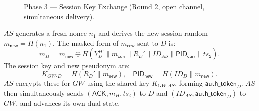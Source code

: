 \documentclass[conference]{IEEEtran}
\begin{document}
\begin{figure}[!t]
  \caption{Phase 3 — Session Key Exchange (Round 2, open channel, simultaneous delivery).}
  \label{fig:keyex}
\end{figure}

$AS$ generates a fresh nonce $n_1$ and derives the new session random
$m_\mathsf{new} = H(n_1)$.  The masked form of $m_\mathsf{new}$ sent to $D$
is:
\begin{equation}
  m_H = m_\mathsf{new} \oplus H(Y_D^{H'} \| m_\mathsf{curr} \| R_D'
        \| ID_{AS} \| \mathsf{PID}_\mathsf{curr} \| ts_2).
\end{equation}
The session key and new pseudonym are:
\begin{equation}
  K_{GW\text{-}D} = H(R_D' \| m_\mathsf{new}), \quad
  \mathsf{PID}_\mathsf{new} = H(ID_D \| m_\mathsf{new}).
\end{equation}
$AS$ encrypts these for $GW$ using the shared key
$K_{GW\text{-}AS}$, forming $\mathsf{auth\_token}_D$.
$AS$ then simultaneously sends $(\mathsf{ACK}, m_H, ts_2)$ to $D$ and
$(ID_{AS}, \mathsf{auth\_token}_D)$ to $GW$, and advances its own dual state.
\end{document}
